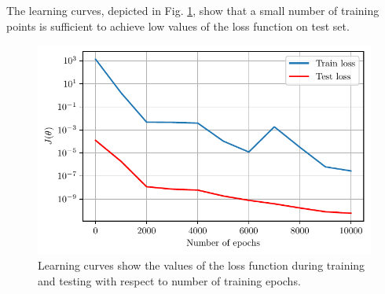 \documentclass[conference]{IEEEtran}
\begin{document}
The learning curves, depicted in Fig. \ref{fig.loss}, show that a small number of training points is sufficient to achieve low values of the loss function on test set.
\begin{figure}[!t]
\centering
 \includegraphics[width=\linewidth]{figs/loss.pdf}
\caption{Learning curves show the values of the loss function during training and testing with respect to number of training epochs.}
\label{fig.loss}
\end{figure}
\end{document}
